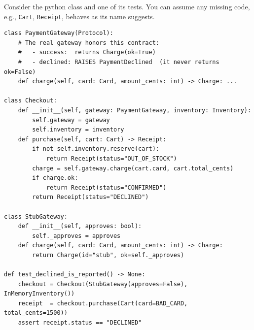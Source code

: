 \documentclass[addpoints]{exam}
\newcommand{\boxedanswer}[2]{\ifprintanswers\answer{#2}\else\makeemptybox{#1}\fi}
\begin{document}
\begin{questions}

\question Consider the python class and one of its tests. You can
  assume any missing code, e.g., \texttt{Cart},
  \texttt{Receipt}, behaves as its name suggests.
  \begin{verbatim}
class PaymentGateway(Protocol):
    # The real gateway honors this contract:
    #   - success:  returns Charge(ok=True)
    #   - declined: RAISES PaymentDeclined  (it never returns ok=False)
    def charge(self, card: Card, amount_cents: int) -> Charge: ...

class Checkout:
    def __init__(self, gateway: PaymentGateway, inventory: Inventory):
        self.gateway = gateway
        self.inventory = inventory
    def purchase(self, cart: Cart) -> Receipt:
        if not self.inventory.reserve(cart):
            return Receipt(status="OUT_OF_STOCK")
        charge = self.gateway.charge(cart.card, cart.total_cents)
        if charge.ok:
            return Receipt(status="CONFIRMED")
        return Receipt(status="DECLINED")

class StubGateway:
    def __init__(self, approves: bool):
        self._approves = approves
    def charge(self, card: Card, amount_cents: int) -> Charge:
        return Charge(id="stub", ok=self._approves)

def test_declined_is_reported() -> None:
    checkout = Checkout(StubGateway(approves=False), InMemoryInventory())
    receipt  = checkout.purchase(Cart(card=BAD_CARD, total_cents=1500))
    assert receipt.status == "DECLINED"
  \end{verbatim}
\newpage
{}
\end{questions}
\end{document}
